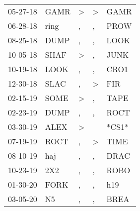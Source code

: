 \begin{supertabular}{lllll}
 05-27-18 &  GAMR &  \textgreater &  \textgreater &   GAMR \\
 06-28-18 &  ring &             , &             , &   PROW \\
 08-25-18 &  DUMP &             , &             , &   LOOK \\
 10-05-18 &  SHAF &  \textgreater &             , &   JUNK \\
 10-19-18 &  LOOK &             , &             , &   CRO1 \\
 12-30-18 &  SLAC &             , &  \textgreater &    FIR \\
 02-15-19 &  SOME &  \textgreater &             , &   TAPE \\
 02-23-19 &  DUMP &             , &             , &   ROCT \\
 03-30-19 &  ALEX &  \textgreater &               &  *CS1* \\
 07-19-19 &  ROCT &             , &  \textgreater &   TIME \\
 08-10-19 &   haj &             , &             , &   DRAC \\
 10-23-19 &   2X2 &             , &             , &   ROBO \\
 01-30-20 &  FORK &             , &             , &    h19 \\
 03-05-20 &    N5 &             , &             , &   BREA \\
\end{supertabular}
